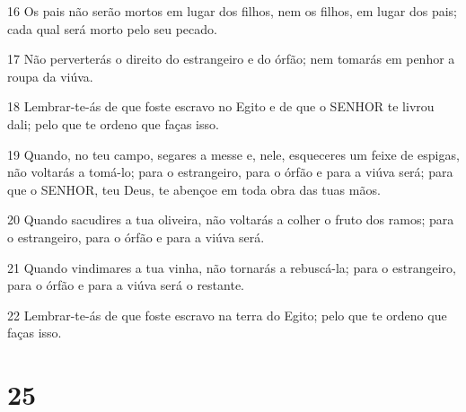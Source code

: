 \par 16 Os pais não serão mortos em lugar dos filhos, nem os filhos, em lugar dos pais; cada qual será morto pelo seu pecado.
\par 17 Não perverterás o direito do estrangeiro e do órfão; nem tomarás em penhor a roupa da viúva.
\par 18 Lembrar-te-ás de que foste escravo no Egito e de que o SENHOR te livrou dali; pelo que te ordeno que faças isso.
\par 19 Quando, no teu campo, segares a messe e, nele, esqueceres um feixe de espigas, não voltarás a tomá-lo; para o estrangeiro, para o órfão e para a viúva será; para que o SENHOR, teu Deus, te abençoe em toda obra das tuas mãos.
\par 20 Quando sacudires a tua oliveira, não voltarás a colher o fruto dos ramos; para o estrangeiro, para o órfão e para a viúva será.
\par 21 Quando vindimares a tua vinha, não tornarás a rebuscá-la; para o estrangeiro, para o órfão e para a viúva será o restante.
\par 22 Lembrar-te-ás de que foste escravo na terra do Egito; pelo que te ordeno que faças isso.

\chapter{25}

